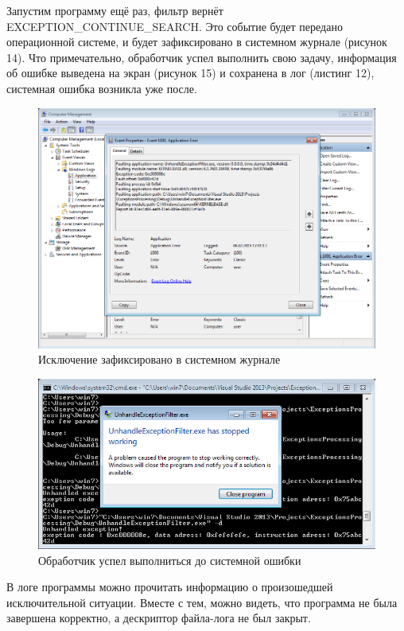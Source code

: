 \documentclass[a4paper, 12pt]{report}		%
\begin{document}
Запустим программу ещё раз,  фильтр вернёт EXCEPTION\_CONTINUE\_SEARCH. Это событие будет передано операционной системе, и будет зафиксировано в системном журнале (рисунок 14). Что примечательно, обработчик успел выполнить свою задачу, информация об ошибке выведена на экран (рисунок 15) и сохранена в лог (листинг 12), системная ошибка возникла уже после.
\newpage

\begin{figure}[h!]
\centering
\includegraphics[scale=0.63]{res/007}
\caption{Исключение зафиксировано в системном журнале}
\end{figure}

\begin{figure}[h!]
\centering
\includegraphics[scale=0.8]{res/008}
\caption{Обработчик успел выполниться до системной ошибки}
\end{figure}

В логе программы можно прочитать информацию о произошедшей исключительной ситуации. Вместе с тем, можно видеть, что программа не была завершена корректно, а дескриптор файла-лога не был закрыт.
\end{document}

